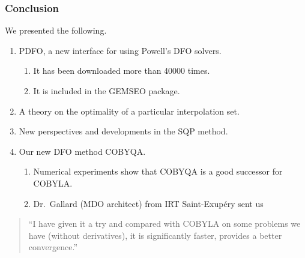\documentclass{polyu-presentation}
\begin{document}
\begin{frame}
    \frametitle{Conclusion}

	We presented the following.
    \begin{enumerate}
        \item \alert{PDFO}, a new interface for using Powell's DFO solvers.
        \begin{enumerate}
            \item It has been downloaded more than \alert{\num{40000} times}.
            \item It is included in the GEMSEO package.
        \end{enumerate}
        \item A theory on the \alert{optimality} of a particular interpolation set.
        \item New perspectives and developments in the \alert{SQP method}.
        \item Our new DFO method \alert{COBYQA}.
        \begin{enumerate}
            \item Numerical experiments show that COBYQA is a \alert{good successor} for COBYLA.
            \item Dr.\ Gallard (MDO architect) from IRT Saint-Exup{\'{e}}ry sent us
        \end{enumerate}
    \end{enumerate}

    \smallskip

    \begin{block}{}
        \begin{quote}
            \small\enquote{I have given it a try and compared with COBYLA on some problems we have (without derivatives), it is significantly faster, provides a better convergence.}
        \end{quote}
    \end{block}
\end{frame}
\end{document}
